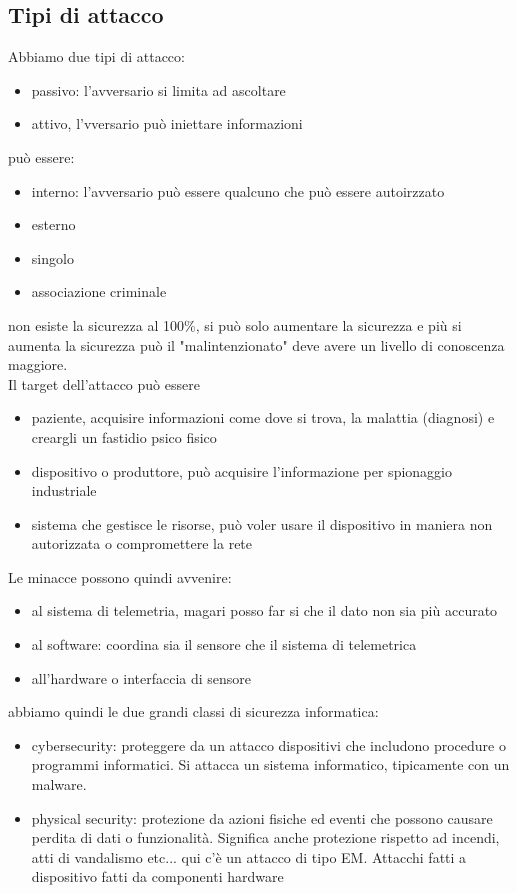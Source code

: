 \documentclass[oneside, 12pt]{extbook}
\begin{document}
\subsection{Tipi di attacco}
Abbiamo due tipi di attacco:
\begin{itemize}
	\item passivo: l'avversario si limita ad ascoltare
	\item attivo, l'vversario può iniettare informazioni
\end{itemize}
può essere:
\begin{itemize}
	\item interno: l'avversario può essere qualcuno che può essere autoirzzato
	\item esterno
\end{itemize}
\begin{itemize}
	\item singolo
	\item associazione criminale
\end{itemize}
non esiste la sicurezza al 100\%, si può solo aumentare la sicurezza e più si aumenta la sicurezza può il "malintenzionato" deve avere un livello di conoscenza maggiore.\\Il target dell'attacco può essere
\begin{itemize}
	\item paziente, acquisire informazioni come dove si trova, la malattia (diagnosi) e creargli un fastidio psico fisico
	\item dispositivo o produttore, può acquisire l'informazione per spionaggio industriale
	\item sistema che gestisce le risorse, può voler usare il dispositivo in maniera non autorizzata o compromettere la rete
\end{itemize}
Le minacce possono quindi avvenire:
\begin{itemize}
	\item al sistema di telemetria, magari posso far si che il dato non sia più accurato
	\item al software: coordina sia il sensore che il sistema di telemetrica
	\item all'hardware o interfaccia di sensore
\end{itemize}
abbiamo quindi le due grandi classi di sicurezza informatica:
\begin{itemize}
	\item cybersecurity: proteggere da un attacco dispositivi che includono procedure o programmi informatici. Si attacca un sistema informatico, tipicamente con un malware.
	\item physical security: protezione da azioni fisiche ed eventi che possono causare perdita di dati o funzionalità. Significa anche protezione rispetto ad incendi, atti di vandalismo etc... qui c'è un attacco di tipo EM. Attacchi fatti a dispositivo fatti da componenti hardware
\end{itemize}
\end{document}
